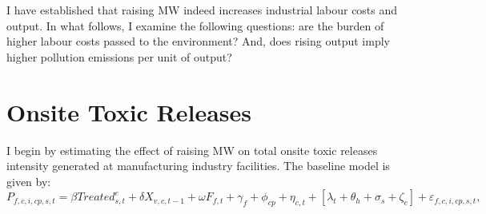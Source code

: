 \documentclass[12pt, english]{article}
\begin{document}
    I have established that raising MW indeed increases industrial labour costs and output. In what follows, I examine the following questions: are the burden of higher labour costs passed to the environment? And, does rising output imply higher pollution emissions per unit of output?


    \section{Onsite Toxic Releases}\label{sec:onsite-toxic-releases}
    I begin by estimating the effect of raising MW on total onsite toxic releases intensity generated at manufacturing industry facilities. The baseline model is given by:
    \begin{equation}
        P_{f,c,i,cp,s,t} = \beta Treated_{s,t}^e + \delta X_{v,c,t-1} + \omega F_{f,t} + \gamma_{f} + \phi_{cp} + \eta_{c,t} + \left[\lambda_{t} + \theta_{h} + \sigma_{s} + \zeta_{c} \right] + \varepsilon_{f,c,i,cp,s,t},\label{eq:baseline-total-onsite-releases-intensity}
    \end{equation}
\end{document}
